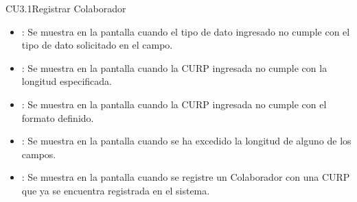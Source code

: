 \begin{UseCase}{CU3.1}{Registrar Colaborador}
{\begin{itemize}
		\item {}: Se muestra en la pantalla  cuando el tipo de dato ingresado no cumple con el tipo de dato solicitado en el campo.
		\item {}: Se muestra en la pantalla  cuando la CURP ingresada no cumple con la longitud especificada.
		\item {}: Se muestra en la pantalla  cuando la CURP ingresada no cumple con el formato definido.
		\item {}: Se muestra en la pantalla  cuando se ha excedido la longitud de alguno de los campos.
		\item {}: Se muestra en la pantalla  cuando se registre un Colaborador con una CURP que ya se encuentra registrada en el sistema.
		\end{itemize}
		}
	\end{UseCase}
